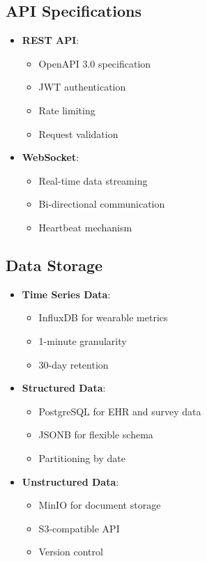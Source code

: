 \documentclass[12pt]{article}
\begin{document}
\subsection{API Specifications}
\begin{itemize}
    \item \textbf{REST API}:
    \begin{itemize}
        \item OpenAPI 3.0 specification
        \item JWT authentication
        \item Rate limiting
        \item Request validation
    \end{itemize}
    \item \textbf{WebSocket}:
    \begin{itemize}
        \item Real-time data streaming
        \item Bi-directional communication
        \item Heartbeat mechanism
    \end{itemize}
\end{itemize}

\subsection{Data Storage}
\begin{itemize}
    \item \textbf{Time Series Data}:
    \begin{itemize}
        \item InfluxDB for wearable metrics
        \item 1-minute granularity
        \item 30-day retention
    \end{itemize}
    \item \textbf{Structured Data}:
    \begin{itemize}
        \item PostgreSQL for EHR and survey data
        \item JSONB for flexible schema
        \item Partitioning by date
    \end{itemize}
    \item \textbf{Unstructured Data}:
    \begin{itemize}
        \item MinIO for document storage
        \item S3-compatible API
        \item Version control
    \end{itemize}
\end{itemize}
\end{document}
